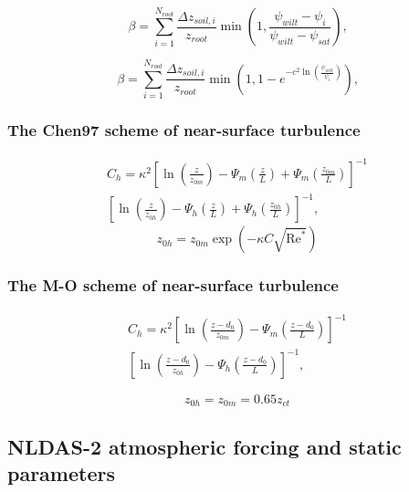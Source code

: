 \documentclass[essd]{copernicus}
\begin{document}
\begin{equation}
  \beta = \sum_{i=1}^{N_{root}} \frac{\Delta z_{soil,i}}{z_{root}}
  \min\left(1, \frac{\psi_{wilt} - \psi_{i}}{\psi_{wilt} - \psi_{sat}}\right)
  \text{,}
\end{equation}

\begin{equation}
  \beta = \sum_{i=1}^{N_{root}} \frac{\Delta z_{soil,i}}{z_{root}}
  \min\left(1, 1 - e^{-c^2 \ln\left(\frac{\psi_{wilt}}{\psi_{i}} \right)} \right)
  \text{,}
\end{equation}

\subsubsection{The Chen97 scheme of near-surface turbulence}

\begin{multline}
  C_h = \kappa^2 \left[ \ln\left(\frac{z}{z_{0m}}\right)
    - \Psi_{m}\left(\frac{z}{L}\right)
    + \Psi_{m}\left(\frac{z_{0m}}{L}\right) \right]^{-1} \\
  \left[ \ln\left(\frac{z}{z_{0h}}\right)
    - \Psi_{h}\left(\frac{z}{L}\right)
    + \Psi_{h}\left(\frac{z_{0h}}{L}\right) \right]^{-1} \text{,}
\end{multline}
\begin{equation}
  z_{0h} = z_{0m} \exp\left(-\kappa C \sqrt{\text{Re}^*}\right)
\end{equation}

\subsubsection{The M-O scheme of near-surface turbulence}

\begin{multline}
  C_h = \kappa^2 \left[ \ln\left(\frac{z-d_0}{z_{0m}}\right)
    - \Psi_{m}\left(\frac{z-d_0}{L}\right) \right]^{-1} \\
  \left[ \ln\left(\frac{z-d_0}{z_{0h}}\right)
    - \Psi_{h}\left(\frac{z-d_0}{L}\right) \right]^{-1}
  \text{,}
\end{multline}

\begin{equation}
  z_{0h} = z_{0m} = 0.65 z_{ct}
\end{equation}


\subsection{NLDAS-2 atmospheric forcing and static parameters}\label{sec:data:nldas}
\end{document}
